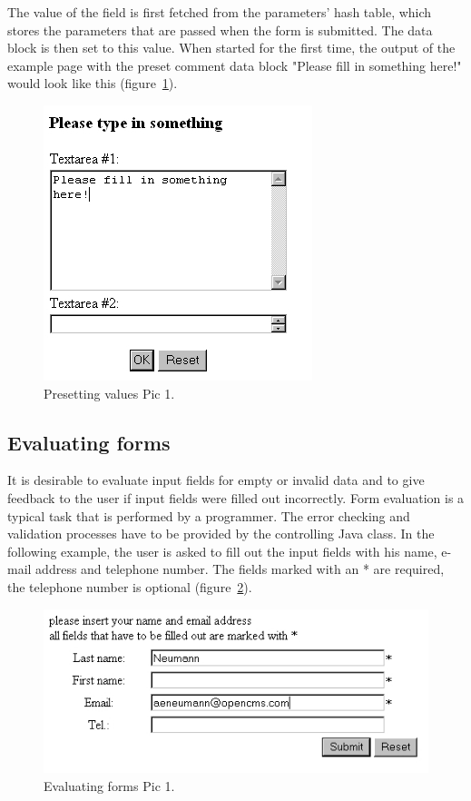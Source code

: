 The value of the field is first fetched from the parameters' hash table,
which stores the parameters that are passed when the form is submitted.
The data block is then set to this value. When started for the first
time, the output of the example page with the preset comment data block
"Please fill in something here!" would look like this (figure~\ref{TypeIn1}).

\begin{figure}
\begin{center}
\includegraphics[clip,width=0.5\linewidth]{pics/modules/40}
\end{center}
\caption[Presetting values pic1]{Presetting values Pic 1.}
\label{TypeIn1}
\end{figure}

\subsection {Evaluating forms}
It is desirable to evaluate input fields for empty or invalid data and
to give feedback to the user if input fields were filled out incorrectly.
Form evaluation is a typical task that is performed by a programmer.
The error checking and validation processes have to be provided by the
controlling Java class. In the following example, the user is asked to
fill out the input fields with his name, e-mail address and telephone
number. The fields marked with an * are required, the telephone number
is optional (figure~\ref{EvaluForms}).

\begin{figure}
\begin{center}
\includegraphics[clip,width=0.7\linewidth]{pics/modules/41}
\end{center}
\caption[Evaluating forms Pic 1]{Evaluating forms Pic 1.}
\label{EvaluForms}
\end{figure}

